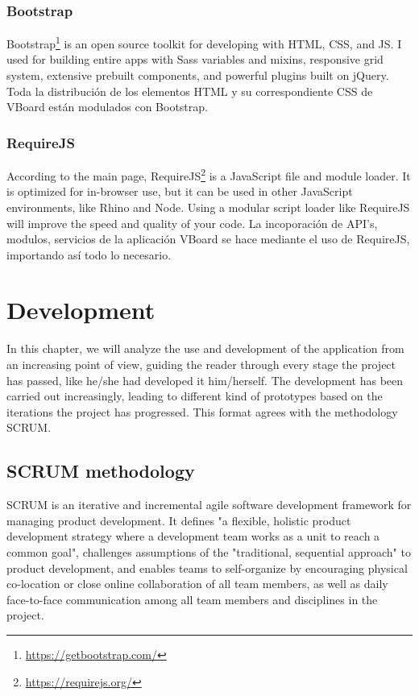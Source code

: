 \documentclass[a4paper, 12pt]{book}
\begin{document}
\subsection{Bootstrap}
Bootstrap\footnote{\url{https://getbootstrap.com/}} is an open source toolkit for developing with HTML, CSS, and JS. I used for building entire apps with Sass variables and mixins, responsive grid system, extensive prebuilt components, and powerful plugins built on jQuery. Toda la distribución de los elementos HTML y su correspondiente CSS de VBoard están modulados con Bootstrap.

\subsection{RequireJS}
According to the main page, RequireJS\footnote{\url{https://requirejs.org/}} is a JavaScript file and module loader. It is optimized for in-browser use, but it can be used in other JavaScript environments, like Rhino and Node. Using a modular script loader like RequireJS will improve the speed and quality of your code. La incoporación de API's, modulos, servicios de la aplicación VBoard se hace mediante el uso de RequireJS, importando así todo lo necesario.




\chapter{Development}

In this chapter, we will analyze the use and development of the application from an increasing point of view, guiding the reader through every stage the project has passed, like he/she had developed it him/herself. The development has been carried out increasingly, leading to different kind of prototypes based on the iterations the project has progressed. This format agrees with the methodology SCRUM.

\section{SCRUM methodology}
SCRUM is an iterative and incremental agile software development framework for managing product development. It defines "a flexible, holistic product development strategy where a development team works as a unit to reach a common goal", challenges assumptions of the "traditional, sequential approach" to product development, and enables teams to self-organize by encouraging physical co-location or close online collaboration of all team members, as well as daily face-to-face communication among all team members and disciplines in the project.
\end{document}
